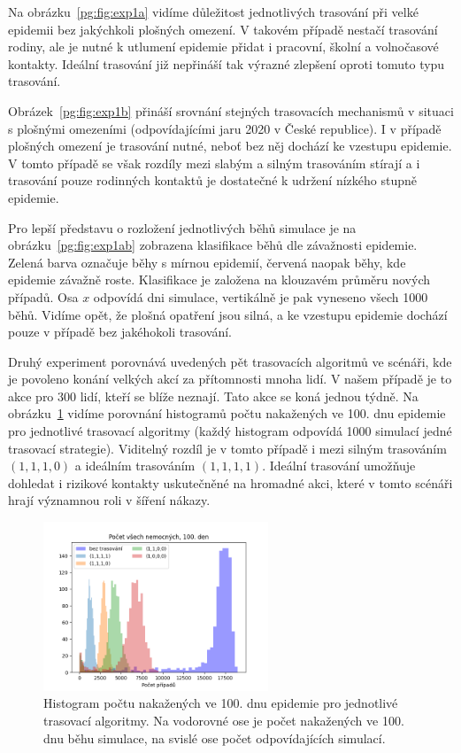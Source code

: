 Na obrázku~\ref{pg:fig:exp1a} vidíme důležitost jednotlivých trasování při
velké epidemii bez jakýchkoli plošných omezení. V takovém případě
nestačí trasování rodiny, ale je nutné k utlumení epidemie přidat i
pracovní, školní a volnočasové kontakty. Ideální trasování již
nepřináší tak výrazné zlepšení oproti tomuto typu trasování.

Obrázek~\ref{pg:fig:exp1b} přináší srovnání stejných trasovacích
mechanismů v situaci s plošnými omezeními (odpovídajícími jaru 2020 v
České republice). I v případě plošných omezení je trasování nutné,
neboť bez něj dochází ke vzestupu epidemie. V tomto případě
se však rozdíly mezi slabým a silným trasováním stírají a i trasování
pouze rodinných kontaktů je dostatečné k udržení nízkého stupně epidemie. 

Pro lepší představu o rozložení jednotlivých běhů simulace je na
obrázku~\ref{pg:fig:exp1ab} zobrazena klasifikace běhů dle závažnosti
epidemie. Zelená barva označuje běhy s mírnou epidemií, červená naopak běhy,
kde epidemie závažně roste. Klasifikace je založena na klouzavém průměru
nových případů. Osa $x$ odpovídá dni simulace, vertikálně je pak vyneseno
všech 1000 běhů. Vidíme opět, že plošná opatření jsou silná, a ke vzestupu
epidemie dochází pouze v případě bez jakéhokoli trasování. 


Druhý experiment porovnává uvedených pět trasovacích algoritmů ve
scénáři, kde je povoleno konání velkých akcí za přítomnosti mnoha
lidí. V našem případě je to akce pro 300 lidí, kteří se blíže
neznají. Tato akce se koná jednou týdně. Na obrázku~\ref{pg:fig:exp2}
vidíme porovnání histogramů počtu nakažených ve 100. dnu epidemie pro
jednotlivé trasovací algoritmy (každý histogram odpovídá 1000
simulací jedné trasovací strategie). Viditelný rozdíl je v tomto
případě i mezi silným trasováním $(1, 1, 1, 0)$ a ideálním trasováním
$(1, 1, 1, 1)$. Ideální trasování umožňuje dohledat i rizikové
kontakty uskutečněné na hromadné akci, které v tomto scénáři hrají
významnou roli v šíření nákazy.

\begin{figure}[ht!]
  \centering
  \includegraphics[width=0.6\textwidth]{pic/histogram_party2.png}
  \caption{Histogram  počtu nakažených ve 100. dnu epidemie pro jednotlivé trasovací algoritmy.
  Na vodorovné ose je počet nakažených ve 100. dnu běhu simulace, na svislé ose počet odpovídajících simulací.}
  \label{pg:fig:exp2}
\end{figure}




